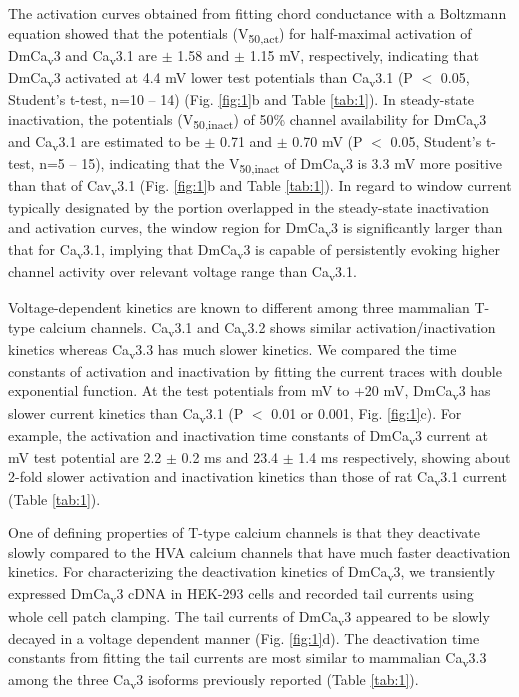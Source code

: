 The activation curves obtained from fitting chord conductance with a Boltzmann equation showed that the potentials (V\textsubscript{50,act}) for half-maximal activation of DmCa\textsubscript{v}3 and Ca\textsubscript{v}3.1 are  $\pm$ 1.58 and  $\pm$ 1.15 mV, respectively, indicating that DmCa\textsubscript{v}3 activated at 4.4 mV lower test potentials than Ca\textsubscript{v}3.1 (P $<$ 0.05, Student's t-test, n=10 -- 14) (Fig. \ref{fig:1}b and Table \ref{tab:1}).
In steady-state inactivation, the potentials (V\textsubscript{50,inact}) of 50\% channel availability for DmCa\textsubscript{v}3 and Ca\textsubscript{v}3.1 are estimated to be  $\pm$ 0.71 and  $\pm$ 0.70 mV (P $<$ 0.05, Student's t-test, n=5 -- 15), indicating that the V\textsubscript{50,inact} of DmCa\textsubscript{v}3 is 3.3 mV more positive than that of Cav\textsubscript{v}3.1 (Fig. \ref{fig:1}b and Table \ref{tab:1}).
In regard to window current typically designated by the portion overlapped in the steady-state inactivation and activation curves, the window region for DmCa\textsubscript{v}3 is significantly larger than that for Ca\textsubscript{v}3.1, implying that DmCa\textsubscript{v}3 is capable of persistently evoking higher channel activity over relevant voltage range than Ca\textsubscript{v}3.1.

Voltage-dependent kinetics are known to different among three mammalian T-type calcium channels\cite{10594642}.
Ca\textsubscript{v}3.1 and Ca\textsubscript{v}3.2 shows similar activation/inactivation kinetics whereas Ca\textsubscript{v}3.3 has much slower kinetics.
We compared the time constants of activation and inactivation by fitting the current traces with double exponential function.
At the test potentials from  mV to +20 mV,  DmCa\textsubscript{v}3 has slower current kinetics than Ca\textsubscript{v}3.1 (P $<$ 0.01 or 0.001, Fig. \ref{fig:1}c).
For example, the activation and inactivation time constants of DmCa\textsubscript{v}3 current at  mV test potential are 2.2 $\pm$ 0.2 ms and 23.4 $\pm$ 1.4 ms respectively, showing about 2-fold slower activation and inactivation kinetics than those of rat Ca\textsubscript{v}3.1 current (Table \ref{tab:1}).

One of defining properties of T-type calcium channels is that they deactivate slowly compared to the HVA calcium channels that have much faster deactivation kinetics\cite{9495342, 10066244, 2419479}. 
For characterizing the deactivation kinetics of DmCa\textsubscript{v}3, we transiently expressed DmCa\textsubscript{v}3 cDNA in HEK-293 cells and recorded tail currents using whole cell patch clamping. 
The tail currents of DmCa\textsubscript{v}3 appeared to be slowly decayed in a voltage dependent manner (Fig. \ref{fig:1}d). 
The deactivation time constants from fitting the tail currents are most similar to mammalian Ca\textsubscript{v}3.3 among the three Ca\textsubscript{v}3 isoforms previously reported (Table \ref{tab:1}). 

